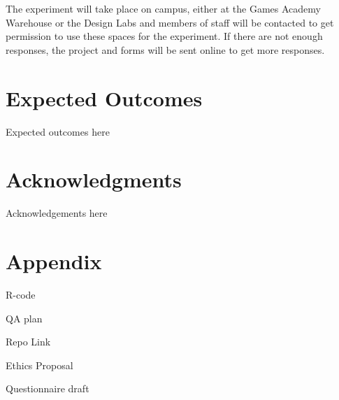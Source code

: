 \documentclass{IEEEtran}
\begin{document}
The experiment will take place on campus, either at the Games Academy Warehouse or the Design Labs and members of staff will be contacted to get permission to use these spaces for the experiment. If there are not enough responses, the project and forms will be sent online to get more responses.

\section{Expected Outcomes}
\label{ExpectedOutcomes}


Expected outcomes here
 
\section*{Acknowledgments}

Acknowledgements here


 

\section*{Appendix}
\label{Appendix}


R-code

QA plan

Repo Link

Ethics Proposal

Questionnaire draft
\end{document}
